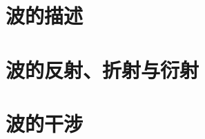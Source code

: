 \documentclass[color=purple,openany]{textbook-cn}
\begin{document}
\begin{Link}
\zhlipsum[1]
\end{Link}



\section{波的描述}
\begin{Point}
\lipsum[2]
\end{Point}

\begin{Case}
\item \lipsum[1][3]
\item \lipsum[1][3]
\item \lipsum[1][3]
\item \lipsum[1][3]
\end{Case}

\begin{Link}
\zhlipsum[1]
\end{Link}




\section{波的反射、折射与衍射}
\begin{Point}
\lipsum[2]
\end{Point}

\begin{Case}
\item \lipsum[1][3]
\item \lipsum[1][3]
\item \lipsum[1][3]
\item \lipsum[1][3]
\end{Case}

\begin{Link}
\zhlipsum[1]
\end{Link}




\section{波的干涉}
\begin{Point}
\lipsum[2]
\end{Point}

\begin{Case}
\item \lipsum[1][3]
\item \lipsum[1][3]
\item \lipsum[1][3]
\item \lipsum[1][3]
\end{Case}
\end{document}
